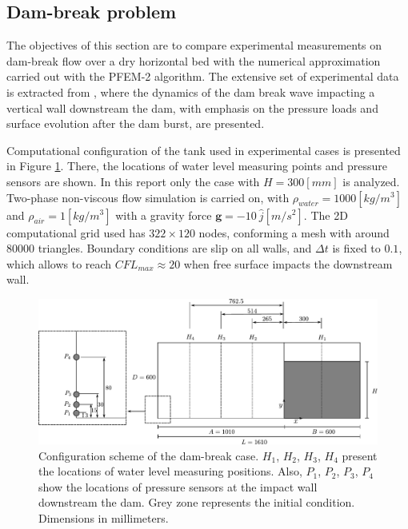 \subsection{Dam-break problem}%

The objectives of this section are to compare experimental measurements on dam-break flow over a dry horizontal bed with the numerical approximation carried out with the PFEM-2 algorithm. The extensive set of experimental data is extracted from \cite{Lobovsky13}, where the dynamics of the dam break wave impacting a vertical wall downstream the dam, with emphasis on the pressure loads and surface evolution after the dam burst, are presented.

Computational configuration of the tank used in experimental cases is presented in Figure \ref{fg:dambreak-config}. There, the locations of water level measuring points and pressure sensors are shown. In this report only the case with $H=300[mm]$ is analyzed. Two-phase non-viscous flow simulation is carried on, with $\rho_{water}=1000[kg/m^3]$ and $\rho_{air}=1[kg/m^3]$ with a gravity force $\mathbf{g}=-10\ \hat{j} [m/s^2]$. The 2D computational grid used has $322\times120$ nodes, conforming a mesh with around $80000$ triangles. Boundary conditions are slip on all walls, and $\Delta t$ is fixed to $0.1$, which allows to reach $CFL_{max}\approx20$ when free surface impacts the downstream wall.

\begin{figure}[htbp]
  \begin{center}
      \includegraphics[width=\columnwidth]{images/dam_break_config.pdf}
  \end{center}
  \caption{\label{fg:dambreak-config} Configuration scheme of the dam-break case. $H_1$, $H_2$, $H_3$, $H_4$ present the locations of water level measuring positions. Also, $P_1$, $P_2$, $P_3$, $P_4$ show the locations of pressure sensors at the impact wall downstream the dam. Grey zone represents the initial condition. Dimensions in millimeters.}
\end{figure}

